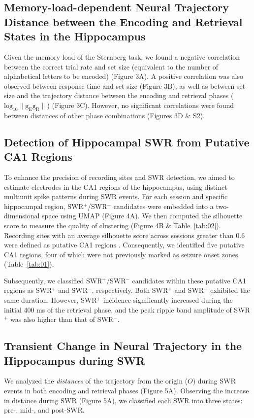 \subsection{Memory-load-dependent Neural Trajectory Distance between the Encoding and Retrieval States in the Hippocampus}
Given the memory load of the Sternberg task, we found a negative correlation between the correct trial rate and set size (equivalent to the number of alphabetical letters to be encoded) (Figure 3A). A positive correlation was also observed between response time and set size (Figure 3B), as well as between set size and the trajectory distance between the encoding and retrieval phases ($\mathrm{log_{10}\lVert g_{E}g_{R} \rVert}$) (Figure 3C). However, no significant correlations were found between distances of other phase combinations (Figures 3D \& S2).

\subsection{Detection of Hippocampal SWR from Putative CA1 Regions}
To enhance the precision of recording sites and SWR detection, we aimed to estimate electrodes in the CA1 regions of the hippocampus, using distinct multiunit spike patterns during SWR events. For each session and specific hippocampal region, SWR$^+$/SWR$^-$ candidates were embedded into a two-dimensional space using UMAP (Figure 4A). We then computed the silhouette score to measure the quality of clustering (Figure 4B \& Table~\ref{tab:02}). Recording sites with an average silhouette score across sessions greater than 0.6 were defined as putative CA1 regions \cite{mcinnes_umap_2018, rousseeuw_silhouettes_1987}. Consequently, we identified five putative CA1 regions, four of which were not previously marked as seizure onset zones (Table~\ref{tab:01}).

Subsequently, we classified SWR$^+$/SWR$^-$ candidates within these putative CA1 regions as SWR$^+$ and SWR$^-$, respectively. Both SWR$^+$ and SWR$^-$ exhibited the same duration. However, SWR$^+$ incidence significantly increased during the initial 400 ms of the retrieval phase, and the peak ripple band amplitude of SWR$^+$ was also higher than that of SWR$^-$.

\subsection{Transient Change in Neural Trajectory in the Hippocampus during SWR}
We analyzed the \textit{distances} of the trajectory from the origin ($O$) during SWR events in both encoding and retrieval phases (Figure 5A). Observing the increase in distance during SWR (Figure 5A), we classified each SWR into three states: pre-, mid-, and post-SWR. 

